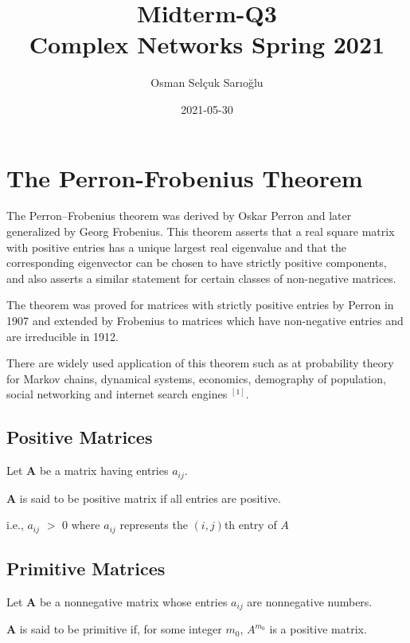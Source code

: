 \documentclass[11pt,a4,twocolumn]{article}
\title{
	Midterm-Q3\\
	Complex Networks Spring 2021\\
}
\author{Osman Selçuk Sarıoğlu}
\date{2021-05-30}							%
\theoremstyle{plain}
\theoremstyle{definition}
\theoremstyle{remark}
\begin{document}
\maketitle




\section{The Perron-Frobenius Theorem}

\par
The Perron–Frobenius theorem was derived by Oskar Perron  and later generalized by Georg Frobenius. This theorem asserts that a real square matrix with positive entries has a unique largest real eigenvalue and that the corresponding eigenvector can be chosen to have strictly positive components, and also asserts a similar statement for certain classes of non-negative matrices. 
\par
The theorem was proved for matrices with strictly positive entries by Perron  in 1907 and extended by Frobenius to matrices which have non-negative entries and are irreducible in 1912.
\par
There are widely used application of this theorem such as at probability theory for Markov chains, dynamical systems, economics, demography of population, social networking and internet search engines $^{[1]}$.


\subsection{Positive Matrices}

Let  $\mathbf{A}$ be a matrix having entries $a_{ij}$.

 $\mathbf{A}$ is said to be positive matrix if all entries are positive. 

i.e., $a_{ij}$ $>$ 0 where $a_{ij}$ represents the $(i, j)$th entry of $A$

\subsection{Primitive Matrices}

Let  $\mathbf{A}$ be a nonnegative matrix whose entries $a_{ij}$ are nonnegative numbers. 

 $\mathbf{A}$ is said to be primitive if, for some integer $m_0$, $A^{m_0}$ is a positive matrix. 
\end{document}
